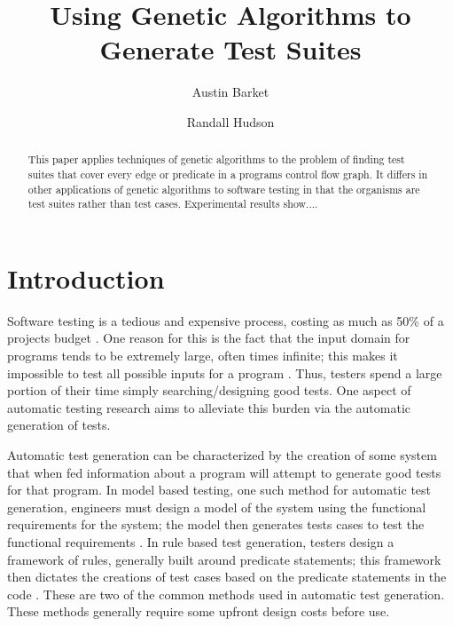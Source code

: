 \documentclass[runningheads]{llncs}
\begin{document}
\pagestyle{headings}
\mainmatter

\title{Using Genetic Algorithms to Generate Test Suites}
\titlerunning{}
\author{Austin Barket \and Randall Hudson}
 \maketitle

\begin{abstract}
This paper applies techniques of genetic algorithms to the problem of finding test suites that cover every edge or predicate in a programs control flow graph. It differs in other applications of genetic algorithms to software testing in that the organisms are test suites rather than test cases. Experimental results show....
\end{abstract}

\section{Introduction}
Software testing is a tedious and expensive process, costing as much as 50\% of a projects budget \cite{meyers1}. One reason for this is the fact that the input domain for programs tends to be extremely large, often times infinite; this makes it impossible to test all possible inputs for a program \cite{meyers1}. Thus, testers spend a large portion of their time simply searching/designing good tests. One aspect of automatic testing research aims to alleviate this burden via the automatic generation of tests.

Automatic test generation can be characterized by the creation of some system that when fed information about a program will attempt to generate good tests for that program. In model based testing, one such method for automatic test generation, engineers must design a model of the system using the functional requirements for the system; the model then generates tests cases to test the functional requirements \cite{model2}. In rule based test generation, testers design a framework of rules, generally built around predicate statements; this framework then dictates the creations of test cases based on the predicate statements in the code \cite{chang3}. These are two of the common methods used in automatic test generation. These methods generally require some upfront design costs before use. 
\end{document}
